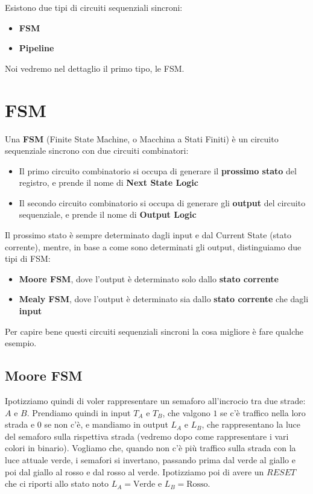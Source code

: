 \documentclass[11pt, a4paper, titlepage, oneside]{scrbook}
\begin{document}
Esistono due tipi di circuiti sequenziali sincroni:
\begin{itemize}
    \item \textbf{FSM} 
    \item \textbf{Pipeline}
\end{itemize}

Noi vedremo nel dettaglio il primo tipo, le FSM.

\section{FSM}

\begin{Definizione}[FSM]
\label{def-FSM}
Una \textbf{FSM} (Finite State Machine, o Macchina a Stati Finiti) è un circuito sequenziale sincrono con due circuiti combinatori:
\begin{itemize}
    \item Il primo circuito combinatorio si occupa di generare il \textbf{prossimo stato} del registro, e prende il nome di \textbf{Next State Logic}
    \item Il secondo circuito combinatorio si occupa di generare gli \textbf{output} del circuito sequenziale, e prende il nome di \textbf{Output Logic}
\end{itemize}
\end{Definizione}

Il prossimo stato è sempre determinato dagli input e dal Current State (stato corrente), mentre, in base a come sono determinati gli output, distinguiamo due tipi di FSM:
\begin{itemize}
    \item \textbf{Moore FSM}, dove l'output è determinato solo dallo \textbf{stato corrente}
    \item \textbf{Mealy FSM}, dove l'output è determinato sia dallo \textbf{stato corrente} che dagli \textbf{input}
\end{itemize}

Per capire bene questi circuiti sequenziali sincroni la cosa migliore è fare qualche esempio. 

\subsection{Moore FSM}

Ipotizziamo quindi di voler rappresentare un semaforo all'incrocio tra due strade: $A$ e $B$. Prendiamo quindi in input $T_A$ e $T_B$, che valgono $1$ se c'è traffico nella loro strada e $0$ se non c'è, e mandiamo in output $L_A$ e $L_B$, che rappresentano la luce del semaforo sulla rispettiva strada (vedremo dopo come rappresentare i vari colori in binario). Vogliamo che, quando non c'è più traffico sulla strada con la luce attuale verde, i semafori si invertano, passando prima dal verde al giallo e poi dal giallo al rosso e dal rosso al verde. Ipotizziamo poi di avere un $RESET$ che ci riporti allo stato noto $L_A = \text{Verde}$ e $L_B = \text{Rosso}$. 
\end{document}
